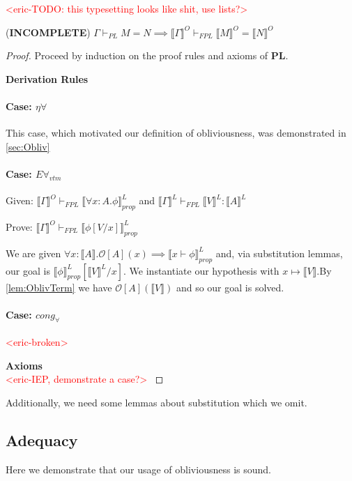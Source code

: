 \documentclass[acmsmall]{acmart}
\newcommand{\den}[1]{\llbracket #1\rrbracket}
\newcommand{\eric}[1]{\textcolor{red}{ <eric-#1> }}
\newcommand{\pl}{$\mathbf{PL}$}
\begin{document}
\eric{TODO: this typesetting looks like shit, use lists?}
\begin{theorem}
  \label{thm:OblivTranslation} (\textbf{INCOMPLETE})
$\Gamma \vdash_{PL} M = N \implies \den{\Gamma}^{O}\vdash_{FPL} \den{M}^{O} = \den{N}^{O} $
\end{theorem}
\begin{proof}
 Proceed by induction on the proof rules and axioms of \pl. 

 \textbf{Derivation Rules}
 \paragraph{Case: $\eta\forall$} This case, which motivated our definition of obliviousness, was demonstrated in \cref{sec:Obliv}
 
 \paragraph{Case: $E\forall_{vtm}$}
 \indent

 Given: $\den{\Gamma}^O \vdash_{FPL} \den{\forall x:A. \phi}^L_{prop}$ and $\den{\Gamma}^L \vdash_{FPL} \den{V}^L : \den{A}^L$

 Prove: $\den{\Gamma}^O \vdash_{FPL} \den{\phi[V/x]}^L_{prop}$

 We are given $\forall x : \den{A}.\mathcal{O}[A](x) \implies \den{x \vdash \phi}^L_{prop}$ and, via substitution lemmas, our goal is $\den{\phi}^L_{prop}[\den{V}^L/x]$. We instantiate our hypothesis with $x \mapsto \den{V}$.By \cref{lem:OblivTerm} we have $\mathcal{O}[A](\den{V})$ and so our goal is solved.

 \paragraph{Case: $cong_\forall$} \eric{broken}

 \textbf{Axioms}\\
\eric{IEP, demonstrate a case?}


\end{proof}
Additionally, we need some lemmas about substitution which we omit.






\subsection{Adequacy}
Here we demonstrate that our usage of obliviousness is sound.
\end{document}
